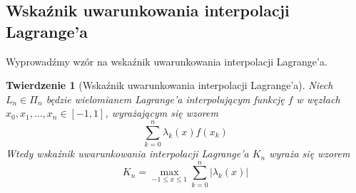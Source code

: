 \documentclass{article}
\newtheorem{twr}{Twierdzenie}
\begin{document}
\subsection{Wskaźnik uwarunkowania interpolacji Lagrange'a}
Wyprowadźmy wzór na wskaźnik uwarunkowania interpolacji Lagrange'a.
\begin{twr}[Wskaźnik uwarunkowania interpolacji Lagrange'a]
Niech $L_n \in \Pi_n$ będzie wielomianem Lagrange'a interpolującym funkcję $f$ w węzłach $x_0, x_1, ..., x_n \in [-1, 1]$, wyrażającym się wzorem
\begin{equation*}
\sum_{k = 0}^n \lambda_k(x) f(x_k)
\end{equation*}
Wtedy wskaźnik uwarunkowania interpolacji Lagrange'a $K_n$ wyraża się wzorem
\begin{equation}
K_n = \max_{-1 \leq x \leq 1} \sum_{k = 0}^n |\lambda_k(x)|
\end{equation}
\end{twr}
\end{document}
